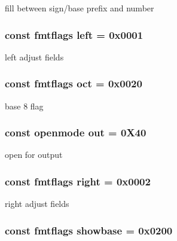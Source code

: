 fill between sign/base prefix and number \hypertarget{classios__base_a3ab7a428d219e30dbd4d99d11bbb1a21}{
\subsubsection[{left}]{\setlength{\rightskip}{0pt plus 5cm}const {\bf fmtflags} left = 0x0001\hspace{0.3cm}{\ttfamily [static]}}}\label{classios__base_a3ab7a428d219e30dbd4d99d11bbb1a21}
left adjust fields \hypertarget{classios__base_a5448c9726ac797a737f548645317206f}{
\subsubsection[{oct}]{\setlength{\rightskip}{0pt plus 5cm}const {\bf fmtflags} oct = 0x0020\hspace{0.3cm}{\ttfamily [static]}}}\label{classios__base_a5448c9726ac797a737f548645317206f}
base 8 flag \hypertarget{classios__base_a5300f1b3e0fe12cc7c484ab89f8bba83}{
\subsubsection[{out}]{\setlength{\rightskip}{0pt plus 5cm}const {\bf openmode} out = 0\-X40\hspace{0.3cm}{\ttfamily [static]}}}\label{classios__base_a5300f1b3e0fe12cc7c484ab89f8bba83}
open for output \hypertarget{classios__base_a5192e88a82b9aefc8ae8f6d57ea4a720}{
\subsubsection[{right}]{\setlength{\rightskip}{0pt plus 5cm}const {\bf fmtflags} right = 0x0002\hspace{0.3cm}{\ttfamily [static]}}}\label{classios__base_a5192e88a82b9aefc8ae8f6d57ea4a720}
right adjust fields \hypertarget{classios__base_a1616f13bfc6964afc5ba93d78177dcf5}{
\subsubsection[{showbase}]{\setlength{\rightskip}{0pt plus 5cm}const {\bf fmtflags} showbase = 0x0200\hspace{0.3cm}{\ttfamily [static]}}}\label{classios__base_a1616f13bfc6964afc5ba93d78177dcf5}

